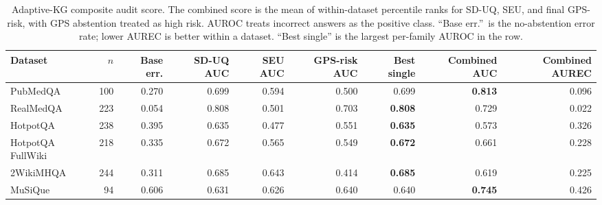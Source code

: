 \begin{table}[t]
\centering
\small
\caption{Adaptive-KG composite audit score.  The combined score is the mean of within-dataset percentile ranks for SD-UQ, SEU, and final GPS-risk, with GPS abstention treated as high risk.  AUROC treats incorrect answers as the positive class.  ``Base err.''\ is the no-abstention error rate; lower AUREC is better within a dataset.  ``Best single'' is the largest per-family AUROC in the row.}
\label{tab:composite_audit_score}
\setlength{\tabcolsep}{4pt}
\begin{tabular}{@{}lrrrrrrrr@{}}
\toprule
Dataset & $n$ & Base err. & SD-UQ AUC & SEU AUC & GPS-risk AUC & Best single & Combined AUC & Combined AUREC \\
\midrule
PubMedQA & 100 & 0.270 & 0.699 & 0.594 & 0.500 & 0.699 & \textbf{0.813} & 0.096 \\
RealMedQA & 223 & 0.054 & 0.808 & 0.501 & 0.703 & \textbf{0.808} & 0.729 & 0.022 \\
HotpotQA & 238 & 0.395 & 0.635 & 0.477 & 0.551 & \textbf{0.635} & 0.573 & 0.326 \\
HotpotQA FullWiki & 218 & 0.335 & 0.672 & 0.565 & 0.549 & \textbf{0.672} & 0.661 & 0.228 \\
2WikiMHQA & 244 & 0.311 & 0.685 & 0.643 & 0.414 & \textbf{0.685} & 0.619 & 0.225 \\
MuSiQue & 94 & 0.606 & 0.631 & 0.626 & 0.640 & 0.640 & \textbf{0.745} & 0.426 \\
\bottomrule
\end{tabular}
\end{table}
